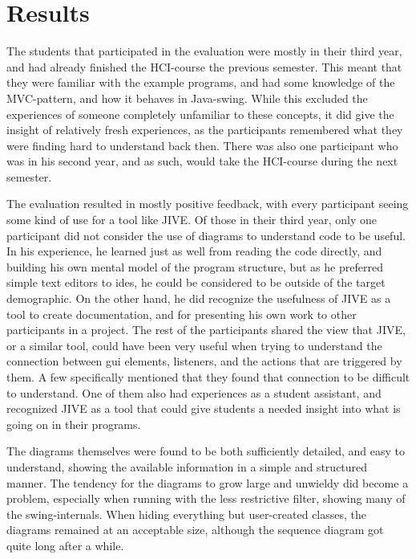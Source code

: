 \section{Results}\label{jiveEvalResults}
The students that participated in the evaluation were mostly in their third year, and had already finished the HCI-course the previous semester.
This meant that they were familiar with the example programs, and had some knowledge of the MVC-pattern, and how it behaves in Java-swing.
While this excluded the experiences of someone completely unfamiliar to these concepts, it did give the insight of relatively fresh experiences, as the participants remembered what they were finding hard to understand back then.
There was also one participant who was in his second year, and as such, would take the HCI-course during the next semester.

The evaluation resulted in mostly positive feedback, with every participant seeing some kind of use for a tool like JIVE.
Of those in their third year, only one participant did not consider the use of diagrams to understand code to be useful.
In his experience, he learned just as well from reading the code directly, and building his own mental model of the program structure, but as he preferred simple text editors to \gls{ide}s, he could be considered to be outside of the target demographic.
On the other hand, he did recognize the usefulness of JIVE as a tool to create documentation, and for presenting his own work to other participants in a project.
The rest of the participants shared the view that JIVE, or a similar tool, could have been very useful when trying to understand the connection between \gls{gui} elements, listeners, and the actions that are triggered by them.
A few specifically mentioned that they found that connection to be difficult to understand.
One of them also had experiences as a student assistant, and recognized JIVE as a tool that could give students a needed insight into what is going on in their programs.

The diagrams themselves were found to be both sufficiently detailed, and easy to understand, showing the available information in a simple and structured manner.
The tendency for the diagrams to grow large and unwieldy did become a problem, especially when running with the less restrictive filter, showing many of the swing-internals.
When hiding everything but user-created classes, the diagrams remained at an acceptable size, although the sequence diagram got quite long after a while.

